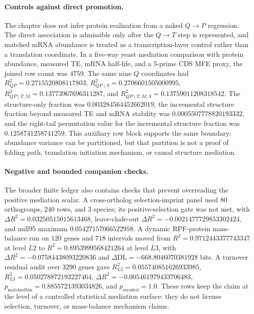 \paragraph{Controls against direct promotion.}
The chapter does not infer protein realization from a naked $Q \to P$ regression.  The direct association is admissible only after the $Q \to T$ step is represented, and matched mRNA abundance is treated as a transcription-layer control rather than a translation coordinate.  In a five-way yeast mediation comparison with protein abundance, measured TE, mRNA half-life, and a 5-prime CDS MFE proxy, the joined row count was $4759$.  The same nine $Q$ coordinates had $R^2_{QP}=0.2715520808117803$, $R^2_{QP\mid S}=0.2706601505000995$, $R^2_{QP\mid T,M}=0.13773967696311287$, and $R^2_{QP\mid T,M,S}=0.13759011208318542$.  The structure-only fraction was $0.003284564452662019$, the incremental structure fraction beyond measured TE and mRNA stability was $0.0005507778820193332$, and the right-tail permutation value for the incremental structure fraction was $0.1258741258741259$.  This auxiliary row block supports the same boundary: abundance variance can be partitioned, but that partition is not a proof of folding path, translation initiation mechanism, or causal structure mediation.

\paragraph{Negative and bounded companion checks.}
The broader finite ledger also contains checks that prevent overreading the positive mediation scalar.  A cross-ortholog selection-imprint panel used $80$ orthogroups, $240$ rows, and $3$ species; its positive-selection gate was not met, with $\Delta R^2=0.03250515015613468$, leave-clade-out $\Delta R^2=-0.0021477729853302424$, and null95 maximum $0.05427157066522958$.  A dynamic RPF-protein mass-balance run on $120$ genes and $718$ intervals moved from $R^2=0.9712443377743347$ at level $L2$ to $R^2=0.8953999568421264$ at level $L3$, with $\Delta R^2=-0.07584438093220836$ and $\Delta\mathrm{DL}=-668.8046070381928$ bits.  A turnover residual audit over $3290$ genes gave $R^2_{L2}=0.055740851626933985$, $R^2_{L3}=0.050278872193227464$, $\Delta R^2=-0.005461979433706483$, $p_{\mathrm{matchedbin}}=0.8855721393034826$, and $p_{\mathrm{recoded}}=1.0$.  These rows keep the claim at the level of a controlled statistical mediation surface: they do not license selection, turnover, or mass-balance mechanism claims.

